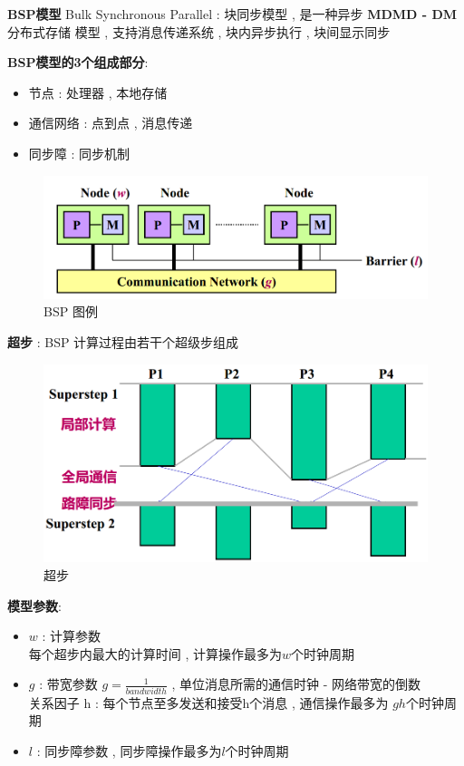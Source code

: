 \documentclass[UTF8,a4paper]{ctexart}
\begin{document}
  \textbf{BSP模型} Bulk Synchronous Parallel  : 块同步模型 , 是一种异步 \textbf{MDMD - DM} 分布式存储 模型 , 支持消息传递系统 , 块内异步执行 , 块间显示同步

  \textbf{BSP模型的3个组成部分}:
  \begin{itemize}
    \item 节点 : 处理器 , 本地存储
    \item 通信网络 : 点到点 , 消息传递
    \item 同步障 : 同步机制
  \end{itemize}

  \begin{figure}[H]
    \centering
    \includegraphics[scale = 0.3]{assets/ParallelComputing_d4198.png}
    \caption{BSP 图例}
  \end{figure}

  \textbf{超步} : BSP 计算过程由若干个超级步组成
  \begin{figure}[H]
    \centering
    \includegraphics[scale = 0.3]{assets/ParallelComputing_bf7df.png}
    \caption{超步}
  \end{figure}

  \textbf{模型参数}:
  \begin{itemize}
    \item $w$ : 计算参数 \\
    每个超步内最大的计算时间 , 计算操作最多为$w$个时钟周期
    \item $g$ : 带宽参数 $g = \frac{1}{bandwidth}$ , 单位消息所需的通信时钟 - 网络带宽的倒数 \\
    关系因子 h : 每个节点至多发送和接受h个消息 , 通信操作最多为 $gh$个时钟周期
    \item $l$ : 同步障参数 , 同步障操作最多为$l$个时钟周期
  \end{itemize}
\end{document}
